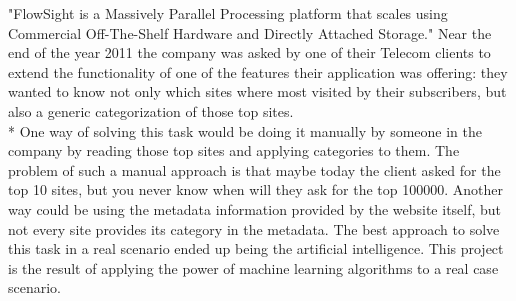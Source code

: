 
"FlowSight is a Massively Parallel Processing platform that scales using Commercial Off-The-Shelf Hardware and Directly Attached Storage."
Near the end of the year 2011 the company was asked by one of their Telecom clients to extend the functionality of one of the features their application was offering: they wanted to know not only which sites
where most visited by their subscribers, but also a generic categorization of those top sites. \\*
One way of solving this task would be doing it manually by someone in the company by reading those top sites and applying categories to them.
The problem of such a manual approach is that maybe today the client asked for the top 10 sites, but you never know when will they ask for the top 100000. 
Another way could be using the metadata information provided by the website itself, but not every site provides its category in the metadata.
The best approach to solve this task in a real scenario ended up being the artificial intelligence.
This project is the result of applying the power of machine learning algorithms to a real case scenario.

